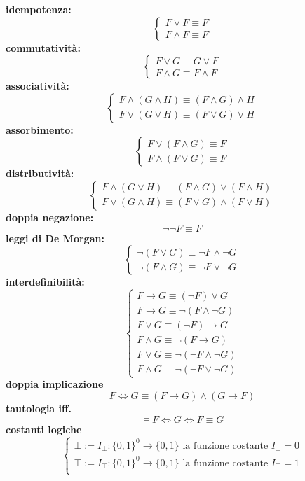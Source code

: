 \noindent
\textbf{idempotenza:} 
$$
\begin{cases}
  F \lor F \equiv F \\
  F \land F \equiv F
\end{cases}
$$
\noindent 
\textbf{commutatività:}
$$
\begin{cases}
  F \lor G \equiv G \lor F \\
  F \land G \equiv F \land F 
\end{cases}
$$
\noindent 
\textbf{associatività:}
$$
\begin{cases}
  F \land (G \land H) \equiv (F \land G) \land H \\
  F \lor (G \lor H) \equiv (F \lor G) \lor H 
\end{cases}
$$
\noindent 
\textbf{assorbimento:}
$$
\begin{cases}
  F \lor (F \land G) \equiv F \\
  F \land (F\lor G) \equiv F 
\end{cases}
$$
\noindent 
\textbf{distributività:}
$$
\begin{cases}
  F \land (G \lor H) \equiv (F \land G) \lor (F \land H) \\
  F \lor (G \land H) \equiv (F \lor G) \land (F \lor H)
\end{cases}
$$
\noindent 
\textbf{doppia negazione:}
$$
\neg\neg F \equiv F 
$$
\noindent 
\textbf{leggi di De Morgan:}
$$
\begin{cases}
  \neg (F \lor G) \equiv \neg F \land \neg G \\
  \neg (F \land G) \equiv \neg F \lor \neg G 
\end{cases}
$$
\noindent 
\textbf{interdefinibilità:}
$$
\begin{cases}
  F \rightarrow G \equiv  (\neg F) \lor G \\
  F \rightarrow G \equiv \neg(F \land \neg G) \\
  F \lor G \equiv (\neg F) \rightarrow G \\
  F \land G \equiv \neg(F \rightarrow G) \\
  F \lor G \equiv \neg (\neg F \land \neg G) \\
  F \land G \equiv \neg(\neg F \lor \neg G)
\end{cases}
$$
\noindent 
\textbf{doppia implicazione}
$$
F \iff G \equiv (F \rightarrow G) \land (G \rightarrow F)
$$
\noindent
\textbf{tautologia iff.}
$$
\models F \iff G \iff F \equiv G
$$
\noindent 
\textbf{costanti logiche}
$$
\begin{cases}
  \bot :=  I_{\bot} : \{0,1\}^0 \rightarrow \{0,1\} \text{ la funzione costante } I_{\bot} =  0 \\
  \top :=  I_{\top} : \{0,1\}^0 \rightarrow \{0,1\} \text{ la funzione costante } I_{\top} =  1 \\
\end{cases}
$$
